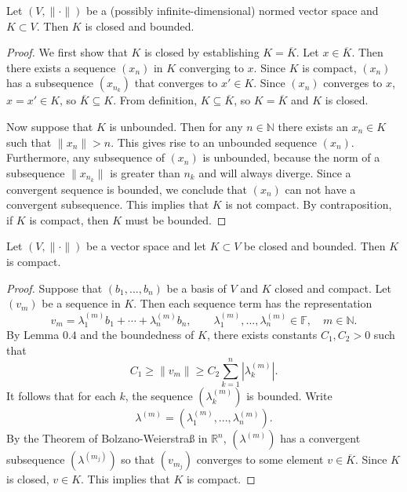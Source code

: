 \documentclass[10pt]{article}
\let\emph\relax %
\newcommand{\F}{\mathbb{F}}
\newcommand{\R}{\mathbb{R}}
\newcommand{\N}{\mathbb{N}}
\newcommand{\emphr}[1]{\textcolor[rgb]{1,0.3,0.2}{\emph{\textbf{#1}}}}
\begin{document}
  \begin{theorem}
    Let $(V,\|\cdot\|)$ be a (possibly infinite-dimensional) normed vector space and $K \subset V$. 
    Then $K$ is closed and bounded.
  \end{theorem}
  \begin{proof}
    We first show that $K$ is closed by establishing $K = \overline{K}$. Let $x \in \overline{K}$.
    Then there exists a sequence $(x_{n})$ in $K$ converging to $x$. 
    Since $K$ is compact, $(x_{n})$ has a subsequence $(x_{n_{k}})$ that converges to $x' \in K$.
    Since $(x_{n})$ converges to $x$, $x = x' \in K$, so $\overline{K} \subseteq K$.
    From definition, $K \subseteq \overline{K}$, so $K = \overline{K}$ and $K$ is closed.

    Now suppose that $K$ is unbounded. Then for any $n \in \N$ there exists an $x_{n} \in K$ such that $\|x_{n}\|>n$.
    This gives rise to an unbounded sequence $(x_{n})$. Furthermore, any subsequence of $(x_{n})$ is unbounded, because
    the norm of a subsequence $\|x_{n_{k}}\|$ is greater than $n_{k}$ and will always diverge.
    Since a convergent sequence is bounded, we conclude that $(x_{n})$ can not have a convergent subsequence.
    This implies that $K$ is not compact. By contraposition, if $K$ is compact, then $K$ must be bounded.
  \end{proof}

  \begin{theorem}
    Let $(V,\|\cdot\|)$ be a \emphr{finite-dimensional} vector space and let $K \subset V$ be closed and bounded.
    Then $K$ is compact.
  \end{theorem}
  
  \begin{proof}
    Suppose that $(b_{1},...,b_{n})$ be a basis of $V$ and $K$ closed and compact. Let $(v_{m})$ be a sequence in $K$.
    Then each sequence term has the representation
    \[
      v_{m} = \lambda_{1}^{(m)}b_{1} + \cdots + \lambda_{n}^{(m)}b_{n},
      \qquad \lambda_{1}^{(m)},...,\lambda_{n}^{(m)} \in \F,\quad m \in \N.  
    \]
    By Lemma $0.4$ and the boundedness of $K$, there exists constants $C_{1},C_{2} > 0$ such that
    \[
      C_{1} \geq \|v_{m}\| \geq C_{2}\sum_{k = 1}^{n}|\lambda_{k}^{(m)}|.  
    \]
    It follows that for each $k$, the sequence $\left(\lambda_{k}^{(m)}\right)$ is bounded.
    Write 
    \[\lambda^{(m)} = \left(\lambda_{1}^{(m)},...,\lambda_{n}^{(m)}\right).\]
    By the Theorem of Bolzano-Weierstra{\ss} in $\R^{n}$, $\left(\lambda^{(m)}\right)$ has a convergent
    subsequence $\left(\lambda^{(m_{j})}\right)$ so that $(v_{m_{j}})$ converges to some element $v \in \overline{K}$.
    Since $K$ is closed, $v \in K$. This implies that $K$ is compact.
  \end{proof}
\end{document}
